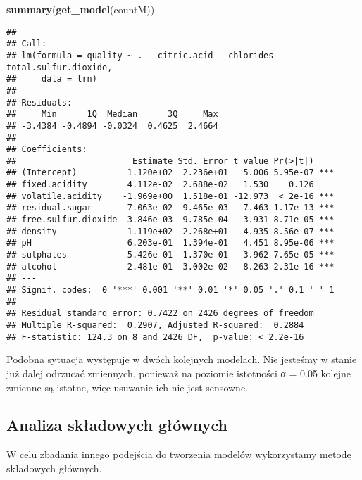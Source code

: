 \documentclass[
]{article}
\newenvironment{Shaded}{\begin{snugshade}}{\end{snugshade}}
\newcommand{\FunctionTok}[1]{\textcolor[rgb]{0.13,0.29,0.53}{\textbf{#1}}}
\newcommand{\NormalTok}[1]{#1}
\begin{document}
\begin{Shaded}
\begin{Highlighting}[]
\FunctionTok{summary}\NormalTok{(}\FunctionTok{get\_model}\NormalTok{(countM))}
\end{Highlighting}
\end{Shaded}

\begin{verbatim}
## 
## Call:
## lm(formula = quality ~ . - citric.acid - chlorides - total.sulfur.dioxide, 
##     data = lrn)
## 
## Residuals:
##     Min      1Q  Median      3Q     Max 
## -3.4384 -0.4894 -0.0324  0.4625  2.4664 
## 
## Coefficients:
##                       Estimate Std. Error t value Pr(>|t|)    
## (Intercept)          1.120e+02  2.236e+01   5.006 5.95e-07 ***
## fixed.acidity        4.112e-02  2.688e-02   1.530    0.126    
## volatile.acidity    -1.969e+00  1.518e-01 -12.973  < 2e-16 ***
## residual.sugar       7.063e-02  9.465e-03   7.463 1.17e-13 ***
## free.sulfur.dioxide  3.846e-03  9.785e-04   3.931 8.71e-05 ***
## density             -1.119e+02  2.268e+01  -4.935 8.56e-07 ***
## pH                   6.203e-01  1.394e-01   4.451 8.95e-06 ***
## sulphates            5.426e-01  1.370e-01   3.962 7.65e-05 ***
## alcohol              2.481e-01  3.002e-02   8.263 2.31e-16 ***
## ---
## Signif. codes:  0 '***' 0.001 '**' 0.01 '*' 0.05 '.' 0.1 ' ' 1
## 
## Residual standard error: 0.7422 on 2426 degrees of freedom
## Multiple R-squared:  0.2907, Adjusted R-squared:  0.2884 
## F-statistic: 124.3 on 8 and 2426 DF,  p-value: < 2.2e-16
\end{verbatim}

Podobna sytuacja występuje w dwóch kolejnych modelach. Nie jesteśmy w
stanie już dalej odrzucać zmiennych, ponieważ na poziomie istotności α =
0.05 kolejne zmienne są istotne, więc usuwanie ich nie jest sensowne.

\subsection{Analiza składowych
głównych}\label{analiza-skux142adowych-gux142uxf3wnych}

W celu zbadania innego podejścia do tworzenia modelów wykorzystamy
metodę składowych głównych.
\end{document}
